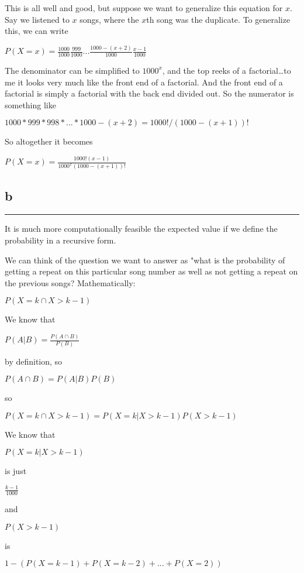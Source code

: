 \documentclass[]{tufte-handout}
\begin{document}
This is all well and good, but suppose we want to generalize this
equation for \(x\). Say we listened to \(x\) songs, where the \(x\)th
song was the duplicate. To generalize this, we can write

\(P(X=x) = \frac{1000}{1000}\frac{999}{1000}...\frac{1000-(x+2)}{1000}\frac{x-1}{1000}\)

The denominator can be simplified to \(1000^x\), and the top reeks of a
factorial\ldots to me it looks very much like the front end of a
factorial. And the front end of a factorial is simply a factorial with
the back end divided out. So the numerator is something like

\(1000*999*998*...*1000-(x+2) = 1000!/(1000-(x+1))!\)

So altogether it becomes

\(P(X = x) = \frac{1000!(x-1)}{1000^x(1000-(x+1))!}\)

\hypertarget{b-7}{%
\subsection{b}\label{b-7}}

\begin{center}\rule{0.5\linewidth}{0.5pt}\end{center}

It is much more computationally feasible the expected value if we define
the probability in a recursive form.

We can think of the question we want to answer as "what is the
probability of getting a repeat on this particular song number as well
as not getting a repeat on the previous songs? Mathematically:

\(P(X = k \cap X > k-1)\)

We know that

\(P(A|B) = \frac{P(A\cap B)}{P(B)}\)

by definition, so

\(P(A\cap B) = P(A|B)P(B)\)

so

\(P(X = k \cap X > k-1) = P(X = k|X > k-1)P(X > k-1)\)

We know that

\(P(X = k|X > k-1)\)

is just

\(\frac{k-1}{1000}\)

and

\(P(X > k-1)\)

is

\(1-(P(X=k-1) + P(X = k-2) + ... + P(X = 2))\)
\end{document}
